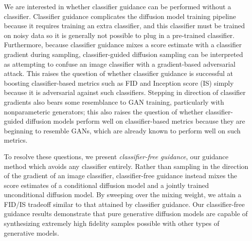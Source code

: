 \documentclass{article} %
\begin{document}
We are interested in whether classifier guidance can be performed without a classifier. Classifier guidance complicates the diffusion model training pipeline because it requires training an extra classifier, and this classifier must be trained on noisy data so it is generally not possible to plug in a pre-trained classifier. Furthermore, because classifier guidance mixes a score estimate with a classifier gradient during sampling, classifier-guided diffusion sampling can be interpreted as attempting to confuse an image classifier with a gradient-based adversarial attack. This raises the question of whether classifier guidance is successful at boosting classifier-based metrics such as FID and Inception score (IS) simply because it is adversarial against such classifiers. Stepping in direction of classifier gradients also bears some resemblance to GAN training, particularly with nonparameteric generators; this also raises the question of whether classifier-guided diffusion models perform well on classifier-based metrics because they are beginning to resemble GANs, which are already known to perform well on such metrics.



To resolve these questions, we present \emph{classifier-free guidance}, our guidance method which avoids any classifier entirely. Rather than sampling in the direction of the gradient of an image classifier, classifier-free guidance instead mixes the score estimates of a conditional diffusion model and a jointly trained unconditional diffusion model. By sweeping over the mixing weight, we attain a FID/IS tradeoff similar to that attained by classifier guidance. Our classifier-free guidance results demonstrate that pure generative diffusion models are capable of synthesizing extremely high fidelity samples possible with other types of generative models.
\end{document}
